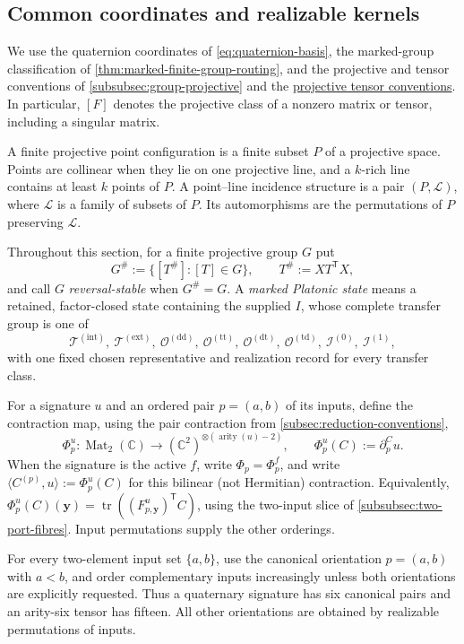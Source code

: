 \documentclass[11pt,letterpaper,onecolumn]{article}
\theoremstyle{plain}
\theoremstyle{definition}
\theoremstyle{remark}
\newcommand{\TetInt}{{\mathcal T^{(\mathrm{int})}}}
\newcommand{\TetExt}{{\mathcal T^{(\mathrm{ext})}}}
\newcommand{\OctDD}{{\mathcal O^{(\mathrm{dd})}}}
\newcommand{\OctTT}{{\mathcal O^{(\mathrm{tt})}}}
\newcommand{\OctDT}{{\mathcal O^{(\mathrm{dt})}}}
\newcommand{\OctTD}{{\mathcal O^{(\mathrm{td})}}}
\newcommand{\IcoZero}{{\mathcal I^{(0)}}}
\newcommand{\IcoOne}{{\mathcal I^{(1)}}}
\newcommand{\Mat}{\operatorname{Mat}}
\newcommand{\arity}{\operatorname{arity}}
\begin{document}
\subsection{Common coordinates and realizable kernels}

We use the quaternion coordinates of \cref{eq:quaternion-basis}, the
marked-group classification of \cref{thm:marked-finite-group-routing}, and
the projective and tensor conventions of
\cref{subsubsec:group-projective} and the \hyperref[subsubsec:projective-tensor-geometry]{projective tensor conventions}.
In particular, \([F]\) denotes the projective class of a nonzero
matrix or tensor, including a singular matrix.

A finite projective point configuration is a finite subset \(P\) of a
projective space. Points are collinear when they lie on one projective
line, and a \(k\)-rich line contains at least \(k\) points of \(P\).
A point--line incidence structure is a pair \((P,\mathcal L)\), where
\(\mathcal L\) is a family of subsets of \(P\). Its automorphisms are
the permutations of \(P\) preserving \(\mathcal L\).

Throughout this section, for a finite projective group \(G\) put
\[
 G^\#:=\{[T^\#]:[T]\in G\},
 \qquad T^\#:=XT^{\mathsf T}X,
\]
 and call \(G\) \emph{reversal-stable} when \(G^\#=G\).  A \emph{marked
 Platonic state} means a retained, factor-closed state containing the
 supplied \(I\), whose
complete transfer group is one of
\[
 \TetInt,\ \TetExt,\ \OctDD,\ \OctTT,\
 \OctDT,\ \OctTD,\
 \IcoZero,\ \IcoOne,
\]
with one fixed chosen representative and realization record for every
transfer class.  

For a signature \(u\) and an ordered pair \(p=(a,b)\) of its inputs, define
the contraction map, using the pair contraction from \cref{subsec:reduction-conventions},
\begin{equation}
  \Phi_p^u:\Mat_2(\mathbb C)\longrightarrow
  {(\mathbb C^2)}^{\otimes(\arity(u)-2)},
  \qquad
  \Phi_p^u(C):=\partial_p^C u.
  \label{eq:platonic-card-map}
\end{equation}
When the signature is the active \(f\), write \(\Phi_p=\Phi_p^f\), and write
\(\langle C^{(p)},u\rangle:=\Phi_p^u(C)\) for this bilinear
(not Hermitian) contraction. Equivalently,
\(\Phi_p^u(C)({\mathbf{y}})=\operatorname{tr}((F^u_{p,\mathbf{y}})^{\mathsf T}C)\),
using the two-input slice of \cref{subsubsec:two-port-fibres}.
Input permutations
supply the other orderings.

For every two-element input set \(\{a,b\}\), use the canonical orientation
\(p=(a,b)\) with \(a<b\), and order complementary inputs increasingly unless
both orientations are explicitly requested.  Thus a quaternary signature has six
canonical pairs and an arity-six tensor has fifteen. All other orientations
are obtained by realizable permutations of inputs.
\end{document}
